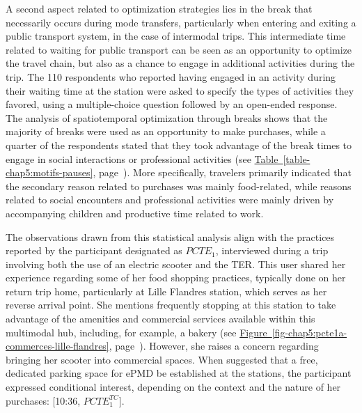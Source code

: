 \begin{refsegment}
A second aspect related to optimization strategies lies in the \gls{break} that necessarily occurs during mode transfers, particularly when entering and exiting a public transport system, in the case of intermodal trips. This intermediate time related to waiting for public transport can be seen as an opportunity to optimize the travel chain, but also as a chance to engage in additional activities during the trip. The 110 respondents who reported having engaged in an activity during their waiting time at the station were asked to specify the types of activities they favored, using a multiple-choice question followed by an open-ended response. The analysis of spatiotemporal optimization through breaks shows that the majority of breaks were used as an opportunity to make purchases, while a quarter of the respondents stated that they took advantage of the break times to engage in social interactions or professional activities (see \hyperref[table-chap5:motifs-pauses]{Table~\ref{table-chap5:motifs-pauses}}, page~\pageref{table-chap5:motifs-pauses}). More specifically, travelers primarily indicated that the secondary reason related to purchases was mainly food-related, while reasons related to social encounters and professional activities were mainly driven by accompanying children and productive time related to work.%


The observations drawn from this statistical analysis align with the practices reported by the participant designated as \(PCTE_{1}\), interviewed during a trip involving both the use of an electric scooter and the \acrshort{TER}. This user shared her experience regarding some of her food shopping practices, typically done on her return trip home, particularly at Lille Flandres station, which serves as her reverse arrival point. She mentions frequently stopping at this station to take advantage of the amenities and commercial services available within this multimodal hub, including, for example, a bakery (see \hyperref[fig-chap5:pcte1a-commerces-lille-flandres]{Figure~\ref{fig-chap5:pcte1a-commerces-lille-flandres}}, page~\pageref{fig-chap5:pcte1a-commerces-lille-flandres}). However, she raises a concern regarding bringing her scooter into commercial spaces. When suggested that a free, dedicated parking space for \acrshort{ePMD} be established at the stations, the participant expressed conditional interest, depending on the context and the nature of her purchases:  [10:36, \(PCTE^{TC}_{1}\)].%


\end{refsegment}
